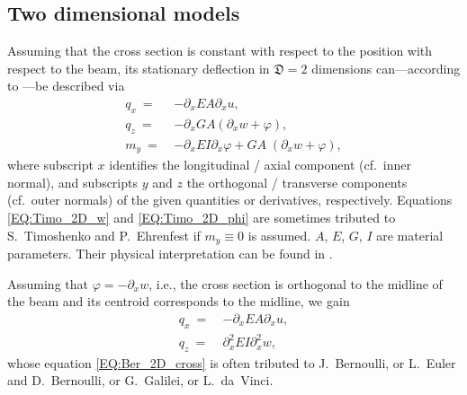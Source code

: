 \documentclass[a4paper, english, 12pt, reqno, draft]{amsart}
\theoremstyle{definition}
\theoremstyle{remark}
\numberwithin{equation}{section}
\newcommand{\globDim}{\ensuremath{\mathfrak D}}
\newcommand{\longDef}{\ensuremath{u}}
\newcommand{\crossDef}{\ensuremath{w}}
\newcommand{\torsion}{\ensuremath{\varphi}}
\newcommand{\force}{\ensuremath{q}}
\newcommand{\momentum}{\ensuremath{m}}
\begin{document}
\subsection{Two dimensional models}
% 
Assuming that the cross section is constant with respect to the position with respect to the beam, its stationary deflection in $\globDim = 2$ dimensions can---according to \cite[Sect.~1.4.3]{MeskourisH2013}---be described via
% 
\begin{subequations}\label{EQ:Timo_2D}
 \begin{align}
  \force_x ~=~ & - \partial_x EA \partial_x \longDef, \label{EQ:beam_long_Timo}\\
  \force_z ~=~ & - \partial_x GA ( \partial_x \crossDef + \torsion ), \label{EQ:Timo_2D_w}\\
  \momentum_y ~=~ & - \partial_x EI \partial_x \torsion + GA \; ( \partial_x \crossDef + \torsion ), \label{EQ:Timo_2D_phi}
 \end{align}
\end{subequations}
% 
where subscript $x$ identifies the longitudinal / axial component (cf.~inner normal), and subscripts $y$ and $z$ the orthogonal / transverse components (cf.~outer normals) of the given quantities or derivatives, respectively. Equations  \eqref{EQ:Timo_2D_w} and \eqref{EQ:Timo_2D_phi} are sometimes tributed to S.~Timoshenko and P.~Ehrenfest if $\momentum_y \equiv 0$ is assumed. $A$, $E$, $G$, $I$ are material parameters. Their physical interpretation can be found in \cite[Sect.~1.3.3]{MeskourisH2013}.

Assuming that $\torsion = - \partial_x \crossDef$, i.e., the cross section is orthogonal to the midline of the beam and its centroid corresponds to the midline, we gain
% 
\begin{subequations}\label{EQ:Ber_2D}
 \begin{align}
  \force_x ~=~ & - \partial_x  EA \partial_x \longDef, \label{EQ:beam_long_Ber}\\
  \force_z ~=~ & \partial_x^2 EI \partial_x^2 \crossDef, \label{EQ:Ber_2D_cross}
 \end{align}
\end{subequations}
% 
whose equation \eqref{EQ:Ber_2D_cross} is often tributed to J.~Bernoulli, or  L.~Euler and D.~Bernoulli, or G.~Galilei, or L.~da~Vinci.
% 
\end{document}
